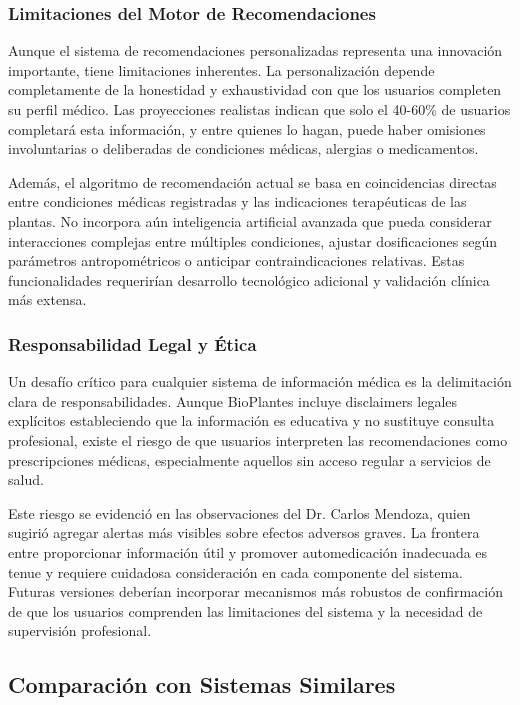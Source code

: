 \documentclass[12pt,a4paper]{article}
\begin{document}
\subsubsection{Limitaciones del Motor de Recomendaciones}

Aunque el sistema de recomendaciones personalizadas representa una innovación importante, tiene limitaciones inherentes. La personalización depende completamente de la honestidad y exhaustividad con que los usuarios completen su perfil médico. Las proyecciones realistas indican que solo el 40-60\% de usuarios completará esta información, y entre quienes lo hagan, puede haber omisiones involuntarias o deliberadas de condiciones médicas, alergias o medicamentos.

Además, el algoritmo de recomendación actual se basa en coincidencias directas entre condiciones médicas registradas y las indicaciones terapéuticas de las plantas. No incorpora aún inteligencia artificial avanzada que pueda considerar interacciones complejas entre múltiples condiciones, ajustar dosificaciones según parámetros antropométricos o anticipar contraindicaciones relativas. Estas funcionalidades requerirían desarrollo tecnológico adicional y validación clínica más extensa.

\subsubsection{Responsabilidad Legal y Ética}

Un desafío crítico para cualquier sistema de información médica es la delimitación clara de responsabilidades. Aunque BioPlantes incluye disclaimers legales explícitos estableciendo que la información es educativa y no sustituye consulta profesional, existe el riesgo de que usuarios interpreten las recomendaciones como prescripciones médicas, especialmente aquellos sin acceso regular a servicios de salud.

Este riesgo se evidenció en las observaciones del Dr. Carlos Mendoza, quien sugirió agregar alertas más visibles sobre efectos adversos graves. La frontera entre proporcionar información útil y promover automedicación inadecuada es tenue y requiere cuidadosa consideración en cada componente del sistema. Futuras versiones deberían incorporar mecanismos más robustos de confirmación de que los usuarios comprenden las limitaciones del sistema y la necesidad de supervisión profesional.

\subsection{Comparación con Sistemas Similares}
\end{document}
